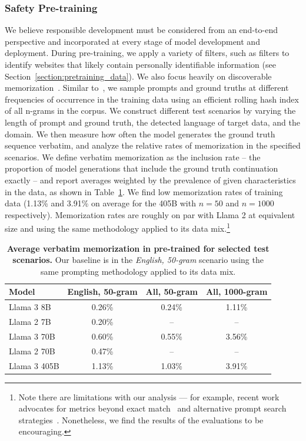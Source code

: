 \documentclass[dvipsnames]{fairmeta}
\begin{document}
\subsubsection{Safety Pre-training}

We believe responsible development must be considered from an end-to-end perspective and incorporated at every stage of model development and deployment. During pre-training, we apply a variety of filters, such as filters to identify websites that likely contain personally identifiable information (see Section~\ref{section:pretraining_data}). We also focus heavily on discoverable memorization~\citep{nasr2023scalableextraction}.
Similar to~\citet{carlini2022quantifying}, we sample prompts and ground truths at different frequencies of occurrence in the training data using an efficient rolling hash index of all n-grams in the corpus.
We construct different test scenarios by varying the length of prompt and ground truth, the detected language of target data, and the domain.
We then measure how often the model generates the ground truth sequence verbatim, and analyze the relative rates of memorization in the specified scenarios.
We define verbatim memorization as the inclusion rate -- the proportion of model generations that include the ground truth continuation exactly -- and report averages weighted by the prevalence of given characteristics in the data, as shown in Table~\ref{table:memorization_results}. We find low memorization rates of training data (1.13\% and 3.91\% on average for the 405B with $n=50$ and $n=1000$ respectively). Memorization rates are roughly on par with Llama 2 at equivalent size and using the same methodology applied to its data mix.\footnote{Note there are limitations with our analysis --- for example, recent work advocates for metrics beyond exact match~\citep{ippolito-etal-2023-preventing} and alternative prompt search strategies~\citep{kassem2024alpacavicunausingllms}. Nonetheless, we find the results of the evaluations to be encouraging.}

\begin{table}
    \centering
    \begin{tabular}{lccc}
        \toprule
        \textbf{Model} & \textbf{English, 50-gram} & \textbf{All, 50-gram} & \textbf{All, 1000-gram} \\
        \midrule
        Llama 3 8B & 0.26\% & 0.24\% & 1.11\% \\
        Llama 2 7B & 0.20\% & --  & -- \\
        \midrule
        Llama 3 70B & 0.60\% & 0.55\% & 3.56\% \\
        Llama 2 70B & 0.47\% & -- & -- \\
        \midrule
        Llama 3 405B & 1.13\% & 1.03\% & 3.91\% \\
        \bottomrule
    \end{tabular}
    \caption{\textbf{Average verbatim memorization in pre-trained \llamathree for selected test scenarios.} Our baseline is \llamatwo in the \textit{English, 50-gram} scenario using the same prompting methodology applied to its data mix.}
    \label{table:memorization_results}
\end{table}
\end{document}
